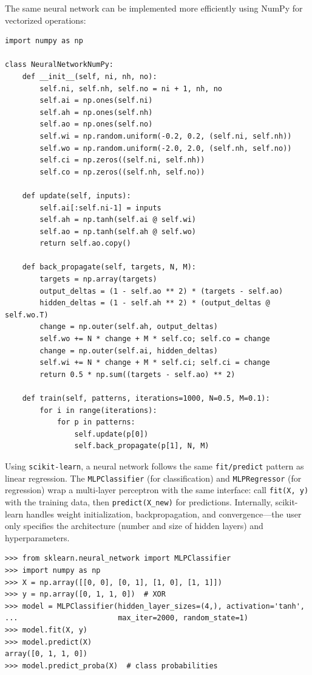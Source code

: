 \documentclass[justified, sixbynine]{tufte-book}
\def\ft{\small\tt}
\theoremstyle{plain}%
\newtheorem * {corollary}{Corollary}
\theoremstyle{definition}
\theoremstyle{remark}
\newtheorem * {remark}{Remark}
\newtheorem * {note}{Note}
\begin{document}
\begin{fullwidth}
The same neural network can be implemented more efficiently using NumPy for vectorized operations:

\begin{lstlisting}
import numpy as np

class NeuralNetworkNumPy:
    def __init__(self, ni, nh, no):
        self.ni, self.nh, self.no = ni + 1, nh, no
        self.ai = np.ones(self.ni)
        self.ah = np.ones(self.nh)
        self.ao = np.ones(self.no)
        self.wi = np.random.uniform(-0.2, 0.2, (self.ni, self.nh))
        self.wo = np.random.uniform(-2.0, 2.0, (self.nh, self.no))
        self.ci = np.zeros((self.ni, self.nh))
        self.co = np.zeros((self.nh, self.no))

    def update(self, inputs):
        self.ai[:self.ni-1] = inputs
        self.ah = np.tanh(self.ai @ self.wi)
        self.ao = np.tanh(self.ah @ self.wo)
        return self.ao.copy()

    def back_propagate(self, targets, N, M):
        targets = np.array(targets)
        output_deltas = (1 - self.ao ** 2) * (targets - self.ao)
        hidden_deltas = (1 - self.ah ** 2) * (output_deltas @ self.wo.T)
        change = np.outer(self.ah, output_deltas)
        self.wo += N * change + M * self.co; self.co = change
        change = np.outer(self.ai, hidden_deltas)
        self.wi += N * change + M * self.ci; self.ci = change
        return 0.5 * np.sum((targets - self.ao) ** 2)

    def train(self, patterns, iterations=1000, N=0.5, M=0.1):
        for i in range(iterations):
            for p in patterns:
                self.update(p[0])
                self.back_propagate(p[1], N, M)
\end{lstlisting}

Using {\ft scikit-learn}, a neural network follows the same {\ft fit/predict} pattern as linear regression. The {\ft MLPClassifier} (for classification) and {\ft MLPRegressor} (for regression) wrap a multi-layer perceptron with the same interface: call {\ft fit(X, y)} with the training data, then {\ft predict(X\_new)} for predictions. Internally, scikit-learn handles weight initialization, backpropagation, and convergence---the user only specifies the architecture (number and size of hidden layers) and hyperparameters.

\begin{lstlisting}
>>> from sklearn.neural_network import MLPClassifier
>>> import numpy as np
>>> X = np.array([[0, 0], [0, 1], [1, 0], [1, 1]])
>>> y = np.array([0, 1, 1, 0])  # XOR
>>> model = MLPClassifier(hidden_layer_sizes=(4,), activation='tanh',
...                       max_iter=2000, random_state=1)
>>> model.fit(X, y)
>>> model.predict(X)
array([0, 1, 1, 0])
>>> model.predict_proba(X)  # class probabilities
\end{lstlisting}


\end{fullwidth}
\end{document}

